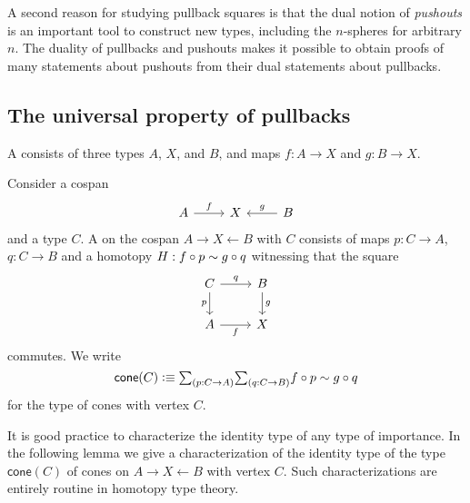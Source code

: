 A second reason for studying pullback squares is that the dual notion of \emph{pushouts} is an important tool to construct new types, including the $n$-spheres for arbitrary $n$. The duality of pullbacks and pushouts makes it possible to obtain proofs of many statements about pushouts from their dual statements about pullbacks.

\subsection{The universal property of pullbacks}

\begin{defn}\label{defn:cospan}
  A  consists of three types $A$, $X$, and $B$, and maps $f:A\to X$ and $g:B\to X$.
\end{defn}

\begin{defn}
  Consider a cospan
  \begin{equation*}
    \begin{tikzcd}
      A \arrow[r,"f"] & X & B \arrow[l,swap,"g"] 
    \end{tikzcd}
  \end{equation*}
  and a type $C$. A  on the cospan $A \rightarrow X \leftarrow B$ with  $C$ consists of maps $p:C\to A$, $q:C\to B$ and a homotopy $H:f\circ p\sim g\circ q$ witnessing that the square
  \begin{equation*}
    \begin{tikzcd}
      C \arrow[r,"q"] \arrow[d,swap,"p"] & B \arrow[d,"g"] \\
      A \arrow[r,swap,"f"] & X
    \end{tikzcd}
  \end{equation*}
  commutes. We write
\begin{equation*}
\mathsf{cone}(C)\defeq \sm{p:C\to A}{q:C\to B}f\circ p\htpy g\circ q
\end{equation*}
for the type of cones with vertex $C$.
\end{defn}

It is good practice to characterize the identity type of any type of importance. In the following lemma we give a characterization of the identity type of the type $\mathsf{cone}(C)$ of cones on $A\rightarrow X\leftarrow B$ with vertex $C$. Such characterizations are entirely routine in homotopy type theory.

